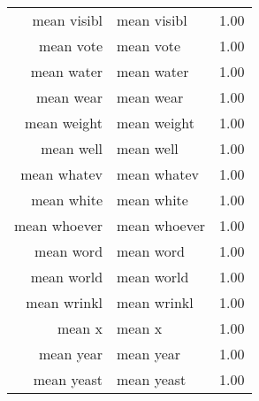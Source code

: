 \begin{table}[ht]
\begin{tabular}{rlr}
  mean visibl & mean visibl & 1.00 \\ 
  mean vote & mean vote & 1.00 \\ 
  mean water & mean water & 1.00 \\ 
  mean wear & mean wear & 1.00 \\ 
  mean weight & mean weight & 1.00 \\ 
  mean well & mean well & 1.00 \\ 
  mean whatev & mean whatev & 1.00 \\ 
  mean white & mean white & 1.00 \\ 
  mean whoever & mean whoever & 1.00 \\ 
  mean word & mean word & 1.00 \\ 
  mean world & mean world & 1.00 \\ 
  mean wrinkl & mean wrinkl & 1.00 \\ 
  mean x & mean x & 1.00 \\ 
  mean year & mean year & 1.00 \\ 
  mean yeast & mean yeast & 1.00 \\ 
   \hline
\end{tabular}
\end{table}

